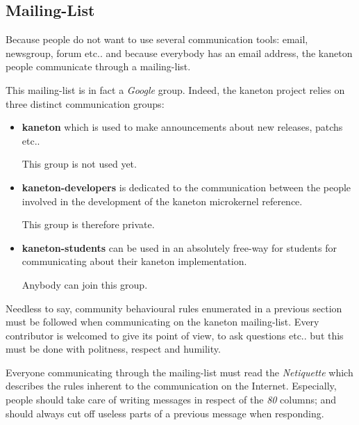 %
%
%
%
%
%

%
%

\subsection{Mailing-List}

Because people do not want to use several communication tools: email,
newsgroup, forum etc.. and because everybody has an email address, the
kaneton people communicate through a mailing-list.

This mailing-list is in fact a \textit{Google} group. Indeed, the kaneton
project relies on three distinct communication groups:

\begin{itemize}
  \item
    \textbf{kaneton} which is used to make announcements about new releases,
    patchs etc..

    \-

    This group is not used yet.
  \item
    \textbf{kaneton-developers} is dedicated to the communication between the
    people involved in the development of the kaneton microkernel reference.

    \-

    This group is therefore private.
  \item
    \textbf{kaneton-students} can be used in an absolutely free-way for
    students for communicating about their kaneton implementation.

    \-

    Anybody can join this group.
\end{itemize}

Needless to say, community behavioural rules enumerated in a previous section
must be followed when communicating on the kaneton mailing-list. Every
contributor is welcomed to give its point of view, to ask questions etc.. but
this must be done with politness, respect and humility.

Everyone communicating through the mailing-list must read the
\textit{Netiquette} which describes the rules inherent to the communication
on the Internet. Especially, people should take care of writing messages in
respect of the \textit{80} columns; and should always cut off useless parts
of a previous message when responding.

